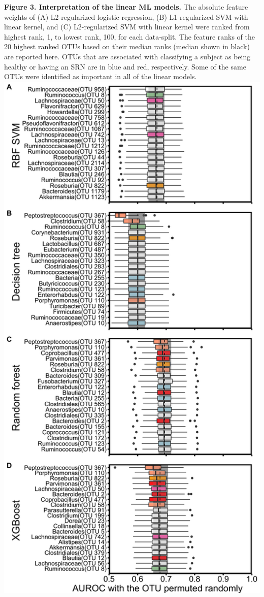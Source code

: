 \documentclass[11pt,]{article}
\begin{document}
\textbf{Figure 3. Interpretation of the linear ML models.} The absolute
feature weights of (A) L2-regularized logistic regression, (B)
L1-regularized SVM with linear kernel, and (C) L2-regularized SVM with
linear kernel were ranked from highest rank, 1, to lowest rank, 100, for
each data-split. The feature ranks of the 20 highest ranked OTUs based
on their median ranks (median shown in black) are reported here. OTUs
that are associated with classifying a subject as being healthy or
having an SRN are in blue and red, respectively. Some of the same OTUs
were identified as important in all of the linear models. \newpage
\includegraphics{Figure_4.png}
\end{document}

